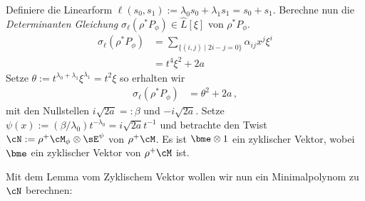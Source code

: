 Definiere die Linearform $\ell(s_0,s_1):=\lambda_0s_0+\lambda_1s_1=s_0+s_1$.
Berechne nun die \emph{Determinanten Gleichung}
$\sigma_\ell(\rho^*P_{\phi})\in \hat L[\xi]$ von $\rho^*P_{\phi}$.
\begin{align*}
\sigma_\ell(\rho^*P_{\phi})
  &= \sum_{\{(i,j)\mid 2i-j=0\}}\alpha_{ij}x^{j}\xi^i\\
  &= t^4\xi^2 + 2a
\end{align*}
Setze $\theta:=t^{\lambda_0+\lambda_1}\xi^{\lambda_1}=t^2\xi$ so erhalten wir
\begin{align*}
\sigma_\ell(\rho^*P_{\phi}) &= \theta^2 + 2a \,,
\end{align*}
mit den Nullstellen $i\sqrt{2a}=:\beta$ und $-i\sqrt{2a}$.
Setze $\psi(x):=(\beta/\lambda_0)t^{-\lambda_0}=i\sqrt{2a}t^{-1}$ und
betrachte den Twist $\cN:=\rho^+\cM_{\phi}\otimes\sE^\psi$ von
$\rho^+\cM$.
Es ist $\bme\otimes 1$ ein zyklischer Vektor, wobei $\bme$ ein zyklischer
Vektor von $\rho^+\cM$ ist.
\iffalse
  Somit existieren $a_0(t)$ und $a_1(t)$ in $\hat L$, so dass
  \[
  0=\partial_t^2 (\bme\otimes 1) + (a_1(t)\partial_t + a_0(t)) \bme\otimes 1
  \]
  und damit ist dann $\cN=\cD/\cD\cdot(\partial_t^2+a_1(t)\partial_t+a_0(t))$.
\fi
Mit dem Lemma vom Zyklischem Vektor wollen wir nun ein Minimalpolynom zu $\cN$
berechnen:
